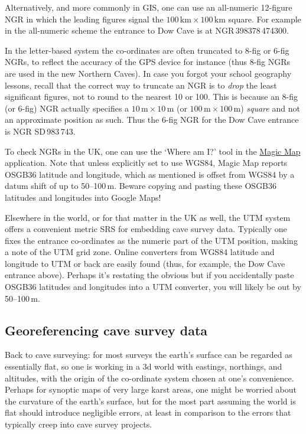 \documentclass[]{article}
\begin{document}
Alternatively, and more commonly in GIS, one can use an all-numeric
12-figure NGR in which the leading figures signal the
$100\,\mathrm{km}\times100\,\mathrm{km}$ 
square. For example in the all-numeric scheme the
entrance to Dow Cave is at NGR\,{\small3}983{\small78}\,{\small4}743{\small00}.

In the letter-based system the co-ordinates are often truncated to 8-fig
or 6-fig NGRs, to reflect the accuracy of the GPS device for instance
(thus 8-fig NGRs are used in the new Northern Caves). In case you forgot
your school geography lessons, recall that the correct way to truncate
an NGR is to \emph{drop} the least significant figures, not to round to
the nearest 10 or 100. This is because an 8-fig (or 6-fig) NGR actually
specifies a $10\,\mathrm{m}\times10\,\mathrm{m}$
(or $100\,\mathrm{m}\times100\,\mathrm{m}$) \emph{square} and not an
approximate position as such. Thus the 6-fig NGR for the Dow Cave
entrance is NGR SD\,983\,743.

To check NGRs in the UK, one can use the `Where am I?' tool in the
\href{http://www.natureonthemap.naturalengland.org.uk/MagicMap.aspx}{Magic
Map} application. Note that unless explicitly set to use WGS84, Magic Map reports OSGB36 latitude and longitude,
which as mentioned is offset from WGS84 by a datum shift of up to
50--100\,m. Beware copying and pasting these OSGB36 latitudes and
longitudes into Google Maps!

Elsewhere in the world, or for that matter in the UK as well, the UTM
system offers a convenient metric SRS for embedding cave survey data.
Typically one fixes the entrance co-ordinates as the numeric part of
the UTM position, making a note of the UTM grid zone. Online
converters from WGS84 latitude and longitude to UTM or back are easily
found (thus, for example, the Dow Cave entrance above). Perhaps it's
restating the obvious but if you accidentally paste OSGB36 latitudes
and longitudes into a UTM converter, you will likely be out by
50--100\,m.

\subsection{Georeferencing cave survey
data}\label{georeferencing-cave-survey-data}

Back to cave surveying: for most surveys the earth's surface can be
regarded as essentially flat, so one is working in a 3d world with
eastings, northings, and altitudes, with the origin of the co-ordinate
system chosen at one's convenience. Perhaps for synoptic maps of very
large karst areas, one might be worried about the curvature of the
earth's surface, but for the most part assuming the world is flat should
introduce negligible errors, at least in comparison to the errors that
typically creep into cave survey projects.
\end{document}
